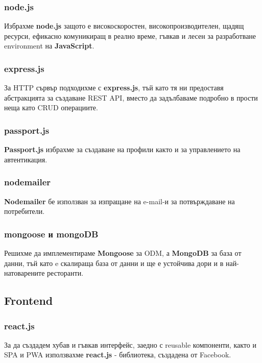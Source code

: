 \documentclass[a4paper]{article}
\begin{document}
\begin{Large}
\subsubsection{node.js}

Избрахме \textbf{node.js} защото е високоскоростен, високопроизводителен, щадящ ресурси, ефикасно комуникиращ в реално време, гъвкав и лесен за разработване environment на \textbf{JavaScript}. 

\subsubsection{express.js}

За HTTP сървър подходихме с \textbf{express.js}, тъй като тя ни предоставя абстракцията за създаване REST API, вместо да задълбаваме подробно в прости неща като CRUD операциите.

\subsubsection{passport.js}

\textbf{Passport.js} избрахме за създаване на профили както и за управлението на автентикация.

\subsubsection{nodemailer}

\textbf{Nodemailer} бе използван за изпращане на e-mail-и за потвърждаване на потребители.

\subsubsection{mongoose и mongoDB}

Решихме да имплементираме \textbf{Mongoose} за ODM, а \textbf{MongoDB} за база от данни, тъй като e скалираща база от данни и ще е устойчива дори и в най-натоварените ресторанти.

\subsection{Frontend}

\subsubsection{react.js}

За да създадем хубав и гъвкав интерфейс, заедно с reusable компоненти, както и SPA и PWA използвахме \textbf{react.js} - библиотека, създадена от Facebook.


\end{Large}
\end{document}

